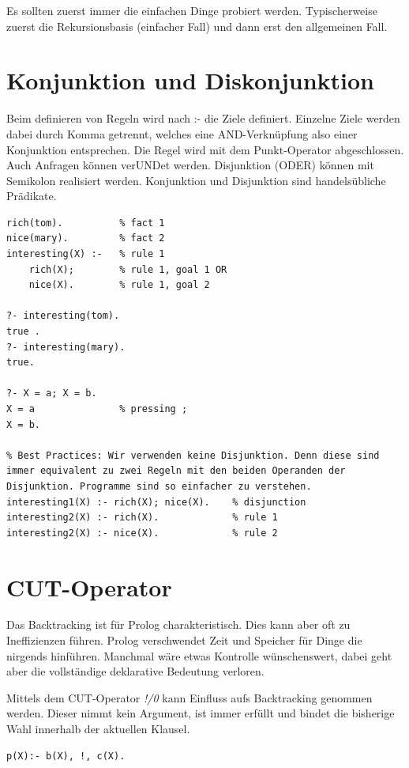 Es sollten zuerst immer die einfachen Dinge probiert werden. Typischerweise zuerst die Rekursionsbasis (einfacher Fall) und dann erst den allgemeinen Fall. 

\newpage
\section{Konjunktion und Diskonjunktion}
Beim definieren von Regeln wird nach :- die Ziele definiert. Einzelne Ziele werden dabei durch Komma getrennt, welches eine AND-Verknüpfung also einer Konjunktion entsprechen. Die Regel wird mit dem Punkt-Operator abgeschlossen. Auch Anfragen können verUNDet werden. Disjunktion (ODER) können mit Semikolon realisiert werden. Konjunktion und Disjunktion sind handelsübliche Prädikate. 

\begin{lstlisting}[caption=Disjunktion]
rich(tom). 			% fact 1
nice(mary). 		% fact 2
interesting(X) :- 	% rule 1
	rich(X); 		% rule 1, goal 1 OR
	nice(X).		% rule 1, goal 2

?- interesting(tom).
true .
?- interesting(mary).
true.

?- X = a; X = b.
X = a 				% pressing ;
X = b.

% Best Practices: Wir verwenden keine Disjunktion. Denn diese sind immer equivalent zu zwei Regeln mit den beiden Operanden der Disjunktion. Programme sind so einfacher zu verstehen.
interesting1(X) :- rich(X); nice(X). 	% disjunction
interesting2(X) :- rich(X). 			% rule 1
interesting2(X) :- nice(X). 			% rule 2
\end{lstlisting}

\newpage
\section{CUT-Operator}
Das Backtracking ist für Prolog charakteristisch. Dies kann aber oft zu Ineffizienzen führen. Prolog verschwendet Zeit und Speicher für Dinge die nirgends hinführen. Manchmal wäre etwas Kontrolle wünschenswert, dabei geht aber die vollständige deklarative Bedeutung verloren.

Mittels dem CUT-Operator \emph{!/0} kann Einfluss aufs Backtracking genommen werden. Dieser nimmt kein Argument, ist immer erfüllt und bindet die bisherige Wahl innerhalb der aktuellen Klausel.

\begin{lstlisting}[caption=Beispiel CUT-Operator]
% Wenn in folgender Regel der CUT erreicht wird. Bindet uns das zur linken Seite, nämlich zur spezifischen Klausel p und zu der Wahl b. Es bindet uns jedoch nicht zur rechten Seite - im Beispiel zur Wahl c.
p(X):- b(X), !, c(X).
\end{lstlisting}

